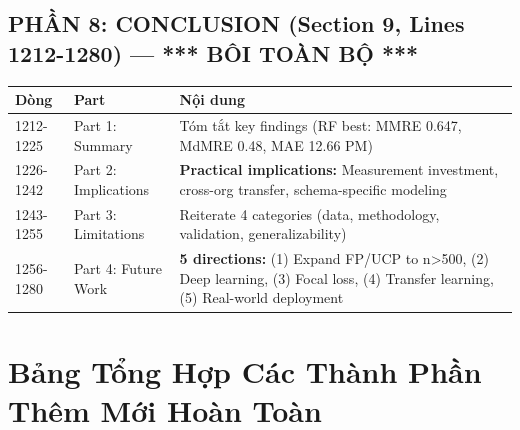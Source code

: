 \documentclass[11pt,a4paper]{article}
\begin{document}
\subsection*{PHẦN 8: CONCLUSION (Section 9, Lines 1212-1280) --- *** BÔI TOÀN BỘ ***}

\begin{longtable}{p{}p{}p{}}
\toprule
\textbf{Dòng} & \textbf{Part} & \textbf{Nội dung} \\
\midrule
1212-1225 & Part 1: Summary & Tóm tắt key findings (RF best: MMRE 0.647, MdMRE 0.48, MAE 12.66 PM) \\
1226-1242 & Part 2: Implications & \textbf{Practical implications:} Measurement investment, cross-org transfer, schema-specific modeling \\
1243-1255 & Part 3: Limitations & Reiterate 4 categories (data, methodology, validation, generalizability) \\
1256-1280 & Part 4: Future Work & \textbf{5 directions:} (1) Expand FP/UCP to n>500, (2) Deep learning, (3) Focal loss, (4) Transfer learning, (5) Real-world deployment \\
\bottomrule
\end{longtable}

\section{Bảng Tổng Hợp Các Thành Phần Thêm Mới Hoàn Toàn}
\end{document}
